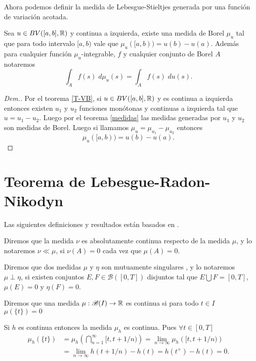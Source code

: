 Ahora podemos definir la medida de Lebesgue-Stieltjes generada por una función de variación acotada.
\begin{thm} \label{Thm:medidas}
	Sea $u\in BV([a,b],\mathbb{R})$ y continua a izquierda, existe una medida de Borel $\mu_{u}$ tal que para todo intervalo $[a,b)$ vale que $\mu_{u}([a,b))=u(b)-u(a)$. Además para cualquier función $\mu_{u}$-integrable, $f$ y cualquier conjunto de Borel $A$ notaremos
	$$\int_{A}f(s)\;d\mu_{u}(s)=\int_{A}f(s)\;du(s).$$  
\end{thm}
\begin{proof}[Dem.]
Por el teorema \ref{T-VB}, si $u\in BV([a,b],\mathbb{R})$ y es continua a izquierda entonces existen $u_1$ y $u_2$ funciones monótonas y continuas a izquierda tal que $u=u_1-u_2$. Luego por el teorema \ref{medidas} las medidas generadas por $u_1$ y $u_2$ son medidas de Borel. Luego si llamamos  $\mu_u=\mu_{u_1}-\mu_{u_2}$  entonces
$$\mu_{u}([a,b))=u(b)-u(a).$$
\end{proof}


\section{Teorema de Lebesgue-Radon-Nikodyn}
Las siguientes definiciones y resultados están basados en \cite[Capitulo 3]{folland}.
\begin{defi}
	Diremos que la medida $\nu$ es absolutamente continua  respecto de la medida $\mu$, y lo notaremos $\nu\ll\mu$\index[Simbolo]{$\ll$}, si $\nu(A)=0$ cada vez que  $\mu(A)=0$.
\end{defi}
\begin{defi}
	Diremos que dos medidas $\mu$ y $\eta$ son mutuamente singulares , y lo notaremos $\mu\perp \eta$,  si existen conjuntos $E,F\in\mathscr{B}([0,T])$ disjuntos tal que $E\bigcup F=[0,T]$, $\mu(E)=0$ y $\eta(F)=0$. \index[Simbolo]{$\perp$}
\end{defi}
\begin{defi}
	Diremos que una medida $\mu:\mathscr{B}(I)\to \mathbb{R}$ es continua  si para todo $t\in I$ $\mu(\{t\})=0$
\end{defi}
\begin{obs}
	Si $h$ es continua entonces la medida $\mu_{h}$ es continua. Pues $\forall t\in[0,T]$
 \begin{equation*}
	\begin{split}
		\mu_{h}(\{t\})&= \mu_{h}\left( \bigcap_{n=1}^{\infty}[t,t+1/n)\right)=\lim_{n\to \infty}\mu_{h}\left( [t,t+1/n)\right)\\&=\lim_{n\to \infty}h(t+1/n)-h(t)=h(t^+)-h(t)=0.
	\end{split}
 \end{equation*}
\end{obs}

